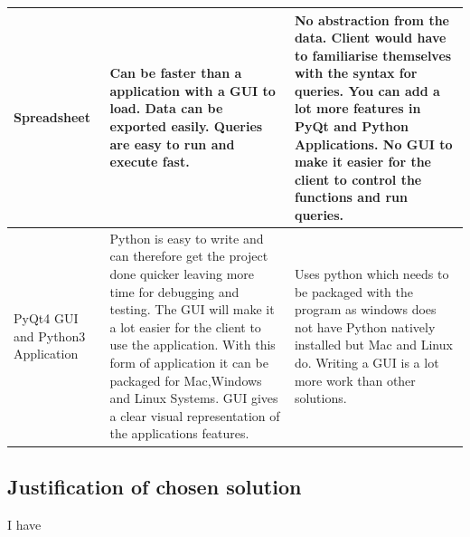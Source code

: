 \begin{flushleft}
\begin{longtable}{|p{3cm}|p{4cm}|p{4cm}|}
Spreadsheet &

Can be faster than a application with a GUI to load.
Data can be exported easily.
Queries are easy to run and execute fast. &

No abstraction from the data.
Client would have to familiarise themselves with the syntax for queries.
You can add a lot more features in PyQt and Python Applications.
No GUI to make it easier for the client to control the functions and run queries. 

\\ \hline

PyQt4 GUI and Python3 Application &

Python is easy to write and can therefore get the project done quicker leaving more time for debugging and testing.
The GUI will make it a lot easier for the client to use the application.
With this form of application it can be packaged for Mac,Windows and Linux Systems.
GUI gives a clear visual representation of the applications features. &

Uses python which needs to be packaged with the program as windows does not have Python natively installed but Mac and Linux do.
Writing a GUI is a lot more work than other solutions. 

\\ \hline

\end{longtable}
\label{tab:Alternative Solutions to the problem}
\end{flushleft}



\subsection{Justification of chosen solution}

\begin{flushleft}
	I have

\end{flushleft}
